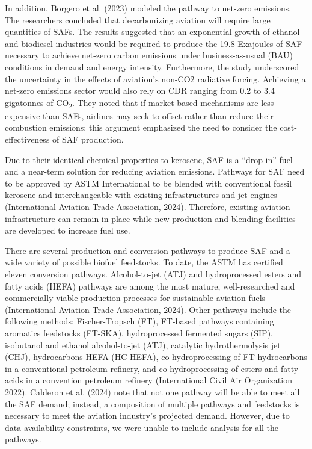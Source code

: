 \documentclass[12pt]{article}
\begin{document}
In addition, Borgero et al. (2023) modeled the pathway to net-zero emissions. The researchers concluded that decarbonizing aviation will require large quantities of SAFs. The results suggested that an exponential growth of ethanol and biodiesel industries would be required to produce the 19.8 Exajoules of SAF necessary to achieve net-zero carbon emissions under business-as-usual (BAU) conditions in demand and energy intensity. Furthermore, the study underscored the uncertainty in the effects of aviation’s non-CO2 radiative forcing. Achieving a net-zero emissions sector would also rely on CDR ranging from 0.2 to 3.4 gigatonnes of CO\textsubscript{2}. They noted that if market-based mechanisms are less expensive than SAFs, airlines may seek to offset rather than reduce their combustion emissions; this argument emphasized the need to consider the cost-effectiveness of SAF production. 

Due to their identical chemical properties to kerosene, SAF is a “drop-in” fuel and a near-term solution for reducing aviation emissions. Pathways for SAF need to be approved by ASTM International to be blended with conventional fossil kerosene and interchangeable with existing infrastructures and jet engines (International Aviation Trade Association, 2024). Therefore, existing aviation infrastructure can remain in place while new production and blending facilities are developed to increase fuel use. 

There are several production and conversion pathways to produce SAF and a wide variety of possible biofuel feedstocks. To date, the ASTM has certified eleven conversion pathways. Alcohol-to-jet (ATJ) and hydroprocessed esters and fatty acids (HEFA) pathways are among the most mature, well-researched and commercially viable production processes for sustainable aviation fuels (International Aviation Trade Association, 2024). Other pathways include the following methods: Fischer-Tropsch (FT), FT-based pathways containing aromatics feedstocks (FT-SKA), hydroprocessed fermented sugars (SIP), isobutanol and ethanol alcohol-to-jet (ATJ), catalytic hydrothermolysis jet (CHJ), hydrocarbons HEFA (HC-HEFA), co-hydroprocessing of FT hydrocarbons in a conventional petroleum refinery, and co-hydroprocessing of esters and fatty acids in a convention petroleum refinery (International Civil Air Organization 2022). Calderon et al. (2024) note that not one pathway will be able to meet all the SAF demand; instead, a composition of multiple pathways and feedstocks is necessary to meet the aviation industry’s projected demand. However, due to data availability constraints, we were unable to include analysis for all the pathways. 
\end{document}
